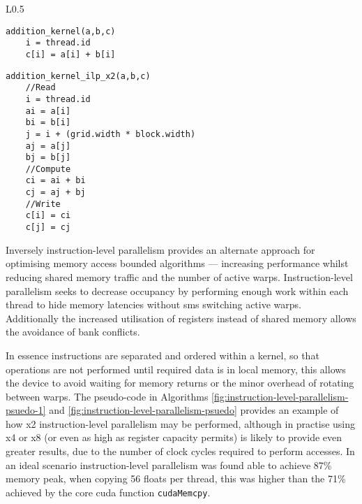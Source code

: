 \begin{wrapfigure}{L}{0.5\textwidth}
\begin{minipage}{0.5\textwidth}
\begin{algorithm}[H]
\begin{lstlisting}
addition_kernel(a,b,c)
    i = thread.id
    c[i] = a[i] + b[i]
\end{lstlisting}
\protect\caption{\label{fig:instruction-level-parallelism-psuedo-1}Pseudo-code for a vector addition kernel without instruction level parallelism.}
\end{algorithm}
\begin{algorithm}[H]
\begin{lstlisting}
addition_kernel_ilp_x2(a,b,c)
    //Read
    i = thread.id
    ai = a[i]
    bi = b[i]
    j = i + (grid.width * block.width)
    aj = a[j]
    bj = b[j]
    //Compute
    ci = ai + bi
    cj = aj + bj
    //Write
    c[i] = ci
    c[j] = cj
\end{lstlisting}
\protect\caption{\label{fig:instruction-level-parallelism-psuedo}Pseudo-code for a vector addition kernel that has been optimised with x2 instruction level parallelism. }
\end{algorithm}
\end{minipage}
\end{wrapfigure}  
      Inversely instruction-level parallelism provides an alternate approach for optimising memory access bounded algorithms --- increasing performance whilst reducing shared memory traffic and the number of active warps. Instruction-level parallelism seeks to decrease occupancy by performing enough work within each thread to hide memory latencies without \glspl{sm} switching active warps. Additionally the increased utilisation of registers instead of shared memory allows the avoidance of bank conflicts.
      
      In essence instructions are separated and ordered within a kernel, so that operations are not performed until required data is in local memory, this allows the device to avoid waiting for memory returns or the minor overhead of rotating between warps. The pseudo-code in Algorithms \ref{fig:instruction-level-parallelism-psuedo-1} and \ref{fig:instruction-level-parallelism-psuedo} provides an example of how x2 instruction-level parallelism may be performed, although in practise using x4 or x8 (or even as high as register capacity permits) is likely to provide even greater results, due to the number of clock cycles required to perform accesses. In an ideal scenario instruction-level parallelism  was found able to achieve 87\% memory peak, when copying 56 floats per thread, this was higher than the 71\% achieved by the core \gls{cuda} function \lstinline!cudaMemcpy!. \cite{VV10} 
      
